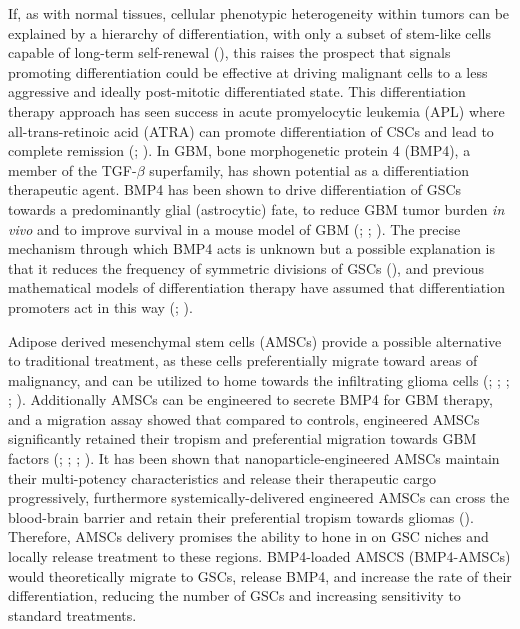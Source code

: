 \documentclass[
  letterpaper,
]{scrreprt}
\theoremstyle{definition}
\theoremstyle{remark}
\begin{document}
If, as with normal tissues, cellular phenotypic heterogeneity within
tumors can be explained by a hierarchy of differentiation, with only a
subset of stem-like cells capable of long-term self-renewal
(), this
raises the prospect that signals promoting differentiation could be
effective at driving malignant cells to a less aggressive and ideally
post-mitotic differentiated state. This differentiation therapy approach
has seen success in acute promyelocytic leukemia (APL) where
all-trans-retinoic acid (ATRA) can promote differentiation of CSCs and
lead to complete remission (;
). In GBM, bone morphogenetic
protein 4 (BMP4), a member of the TGF-\(\beta\) superfamily, has shown
potential as a differentiation therapeutic agent. BMP4 has been shown to
drive differentiation of GSCs towards a predominantly glial (astrocytic)
fate, to reduce GBM tumor burden \emph{in vivo} and to improve survival
in a mouse model of GBM (;
;
). The precise
mechanism through which BMP4 acts is unknown but a possible explanation
is that it reduces the frequency of symmetric divisions of GSCs
(),
and previous mathematical models of differentiation therapy have assumed
that differentiation promoters act in this way
(;
).

Adipose derived mesenchymal stem cells (AMSCs) provide a possible
alternative to traditional treatment, as these cells preferentially
migrate toward areas of malignancy, and can be utilized to home towards
the infiltrating glioma cells (;
;
;
;
). Additionally AMSCs
can be engineered to secrete BMP4 for GBM therapy, and a migration assay
showed that compared to controls, engineered AMSCs significantly
retained their tropism and preferential migration towards GBM factors
(;
;
;
). It has been shown that
nanoparticle-engineered AMSCs maintain their multi-potency
characteristics and release their therapeutic cargo progressively,
furthermore systemically-delivered engineered AMSCs can cross the
blood-brain barrier and retain their preferential tropism towards
gliomas ().
Therefore, AMSCs delivery promises the ability to hone in on GSC niches
and locally release treatment to these regions. BMP4-loaded AMSCS
(BMP4-AMSCs) would theoretically migrate to GSCs, release BMP4, and
increase the rate of their differentiation, reducing the number of GSCs
and increasing sensitivity to standard treatments.
\end{document}
